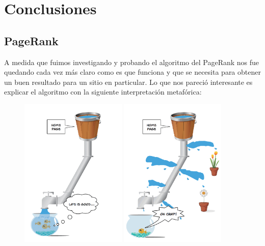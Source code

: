
\section{Conclusiones}

\subsection{PageRank}

A medida que fuimos investigando y probando el algoritmo del PageRank nos fue quedando cada vez más claro como es que funciona y que se necesita para obtener un buen resultado para un sitio en particular.
Lo que nos pareció interesante es explicar el algoritmo con la siguiente interpretación metafórica:

\begin{figure}[h!]

       \includegraphics[width=0.45\textwidth]{imagenes/pagerank-pipe-goldfish.png}
           \hfill
        \includegraphics[width=0.45\textwidth]{imagenes/ohcrap-goldfish-flowers.png}

\end{figure}

